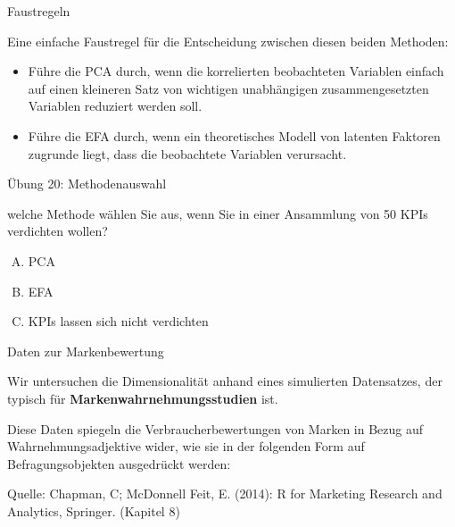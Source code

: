 \documentclass[12pt,ngerman,a4paper,ignorenonframetext,]{beamer}
\providecommand{\tightlist}{%
  \setlength{\itemsep}{0pt}\setlength{\parskip}{0pt}}
\begin{document}
\begin{frame}{Faustregeln}
\protect\hypertarget{faustregeln}{}

Eine einfache Faustregel für die Entscheidung zwischen diesen beiden
Methoden:

\begin{itemize}
\tightlist
\item
  Führe die PCA durch, wenn die korrelierten beobachteten Variablen
  einfach auf einen kleineren Satz von wichtigen unabhängigen
  zusammengesetzten Variablen reduziert werden soll.
\item
  Führe die EFA durch, wenn ein theoretisches Modell von latenten
  Faktoren zugrunde liegt, dass die beobachtete Variablen verursacht.
\end{itemize}

\end{frame}

\begin{frame}{Übung 20: Methodenauswahl}
\protect\hypertarget{ubung-20-methodenauswahl}{}

welche Methode wählen Sie aus, wenn Sie in einer Ansammlung von 50 KPIs
verdichten wollen?

\begin{enumerate}
[A.]
\tightlist
\item
  PCA
\item
  EFA
\item
  KPIs lassen sich nicht verdichten
\end{enumerate}


\end{frame}

\begin{frame}{Daten zur Markenbewertung}
\protect\hypertarget{daten-zur-markenbewertung}{}

Wir untersuchen die Dimensionalität anhand eines simulierten
Datensatzes, der typisch für \textbf{Markenwahrnehmungsstudien} ist.

Diese Daten spiegeln die Verbraucherbewertungen von Marken in Bezug auf
Wahrnehmungsadjektive wider, wie sie in der folgenden Form auf
Befragungsobjekten ausgedrückt werden:

Quelle: Chapman, C; McDonnell Feit, E. (2014): R for Marketing Research
and Analytics, Springer. (Kapitel 8)

\end{frame}
\end{document}
